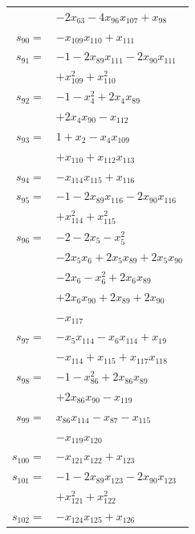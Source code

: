 \begin{longtable}{@{}r@{\;}l@{}}
 & \(\displaystyle -2x_{63} -4x_{96}x_{107} +x_{98}\) \\[3pt]
\(s_{90}=\) & \(\displaystyle -x_{109}x_{110} +x_{111}\) \\[3pt]
\(s_{91}=\) & \(\displaystyle -1 -2x_{89}x_{111} -2x_{90}x_{111}\) \\
 & \(\displaystyle +x_{109}^{2} +x_{110}^{2}\) \\[3pt]
\(s_{92}=\) & \(\displaystyle -1 -x_{4}^{2} +2x_{4}x_{89}\) \\
 & \(\displaystyle +2x_{4}x_{90} -x_{112}\) \\[3pt]
\(s_{93}=\) & \(\displaystyle 1 +x_{2} -x_{4}x_{109}\) \\
 & \(\displaystyle +x_{110} +x_{112}x_{113}\) \\[3pt]
\(s_{94}=\) & \(\displaystyle -x_{114}x_{115} +x_{116}\) \\[3pt]
\(s_{95}=\) & \(\displaystyle -1 -2x_{89}x_{116} -2x_{90}x_{116}\) \\
 & \(\displaystyle +x_{114}^{2} +x_{115}^{2}\) \\[3pt]
\(s_{96}=\) & \(\displaystyle -2 -2x_{5} -x_{5}^{2}\) \\
 & \(\displaystyle -2x_{5}x_{6} +2x_{5}x_{89} +2x_{5}x_{90}\) \\
 & \(\displaystyle -2x_{6} -x_{6}^{2} +2x_{6}x_{89}\) \\
 & \(\displaystyle +2x_{6}x_{90} +2x_{89} +2x_{90}\) \\
 & \(\displaystyle -x_{117}\) \\[3pt]
\(s_{97}=\) & \(\displaystyle -x_{5}x_{114} -x_{6}x_{114} +x_{19}\) \\
 & \(\displaystyle -x_{114} +x_{115} +x_{117}x_{118}\) \\[3pt]
\(s_{98}=\) & \(\displaystyle -1 -x_{86}^{2} +2x_{86}x_{89}\) \\
 & \(\displaystyle +2x_{86}x_{90} -x_{119}\) \\[3pt]
\(s_{99}=\) & \(\displaystyle x_{86}x_{114} -x_{87} -x_{115}\) \\
 & \(\displaystyle -x_{119}x_{120}\) \\[3pt]
\(s_{100}=\) & \(\displaystyle -x_{121}x_{122} +x_{123}\) \\[3pt]
\(s_{101}=\) & \(\displaystyle -1 -2x_{89}x_{123} -2x_{90}x_{123}\) \\
 & \(\displaystyle +x_{121}^{2} +x_{122}^{2}\) \\[3pt]
\(s_{102}=\) & \(\displaystyle -x_{124}x_{125} +x_{126}\) \\[3pt]

\end{longtable}
